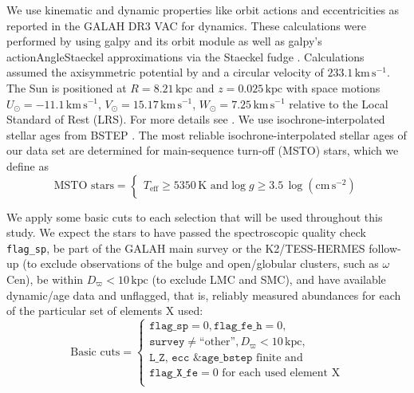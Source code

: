 \documentclass[fleqn,usenatbib]{mnras}
\newcommand{\kpc}{\,\mathrm{kpc}}	%
\newcommand{\kms}{\,\mathrm{km\,s^{-1}}}	%
\begin{document}
We use kinematic and dynamic properties like orbit actions and eccentricities as reported in the GALAH DR3 VAC for dynamics. These calculations were performed by using {\sc galpy} \citep{Bovy2015} and its {\sc orbit} module as well as {\sc galpy}'s {\sc actionAngleStaeckel} approximations via the Staeckel fudge  \citep{Binney2012, Mackereth2018}. Calculations assumed the axisymmetric potential by \citet{McMillan2017} and a circular velocity of $233.1\kms$. The Sun is positioned at $R = 8.21\kpc$ and $z=0.025\kpc$ \citep{Juric2008} with space motions $U_\odot = -11.1\kms$, $V_\odot = 15.17\kms$, $W_\odot = 7.25\kms$ \citep{Schoenrich2010,Reid2004} relative to the Local Standard of Rest (LRS).  For more details see \citet{Buder2021}. We use isochrone-interpolated stellar ages from BSTEP \citep{Sharma2018}. The most reliable isochrone-interpolated stellar ages of our data set are determined for main-sequence turn-off (MSTO) stars, which we define as
\begin{equation} \label{eq:msto}
\text{MSTO stars} = 
\begin{cases}
T_\text{eff} \geq 5350\,\mathrm{K} \text{ and} 
\log g \geq 3.5\,\mathrm{\log \left(cm\,s^{-2} \right)} 
\end{cases}
\end{equation}

We apply some basic cuts to each selection that will be used throughout this study. We expect the stars to have passed the spectroscopic quality check \texttt{flag\_sp}, be part of the GALAH main survey or the K2/TESS-HERMES follow-up (to exclude observations of the bulge and open/globular clusters, such as $\omega$\,Cen), be within $D_\varpi < 10 \kpc$ (to exclude LMC and SMC), and have available dynamic/age data and unflagged, that is, reliably measured abundances for each of the particular set of elements X used:\begin{equation} \label{eq:basic_cuts}
\text{Basic cuts} = 
\begin{cases}
\texttt{flag\_sp} = 0, \texttt{flag\_fe\_h} = 0, \\
\texttt{survey} \neq \text{``other''}, D_\varpi < 10\kpc, \\
\texttt{L\_Z}\text{, }\texttt{ecc}\text{ \& }\texttt{age\_bstep} \text{ finite and} \\
\texttt{flag\_X\_fe} = 0 \text{ for each used element X} \\
\end{cases}
\end{equation}
\end{document}
